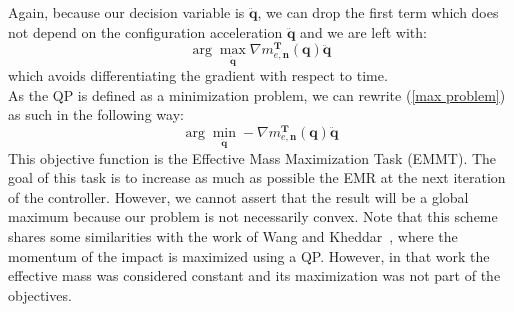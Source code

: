 \documentclass[conference]{IEEEtran}
\begin{document}
Again, because our decision variable is $\mathbf{\ddot q}$, we can drop the first term which does not depend on the configuration acceleration $\mathbf{\ddot q}$ and we are left with:
\begin{equation}
    \arg \max_\mathbf{\ddot q} \nabla m_{e,\mathbf{n}}^\mathbf{T}(\mathbf{q})  \mathbf{\ddot q}
\label{max problem}
\end{equation}
which avoids differentiating the gradient with respect to time. \\
As the QP is defined as a minimization problem, we can rewrite (\ref{max problem}) as such in the following way:
\begin{equation}
    \arg \min_\mathbf{\ddot q} -\nabla m_{e,\mathbf{n}}^\mathbf{T}(\mathbf{q})  \mathbf{\ddot q}
\label{minimization problem}
\end{equation}
This objective function is the Effective Mass Maximization Task (EMMT). 
The goal of this task is to increase as much as possible the EMR at the next iteration of the controller. 
However, we cannot assert that the result will be a global maximum because our problem is not necessarily convex.
Note that this scheme shares some similarities with the work of Wang and Kheddar~\cite{wangImpactFriendlyRobustControl2019}, where the momentum of the impact is maximized using a QP. 
However, in that work the effective mass was considered constant and its maximization was not part of the objectives. 
\end{document}

